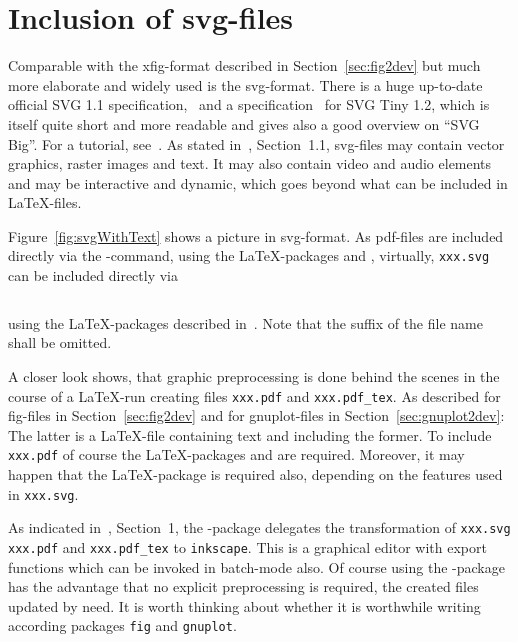 \section{Inclusion of svg-files}\label{sec:picSvg}

Comparable with the xfig-format described in Section~\ref{sec:fig2dev} 
but much more elaborate and widely used is the \gls{svg}-format. 
There is a huge up-to-date official SVG 1.1 specification,~\cite{Svg11} 
and a specification~\cite{Svg12Tiny} for SVG Tiny 1.2, 
which is itself quite short and more readable 
and gives also a good overview on ``SVG Big''. 
For a tutorial, see~\cite{SvgTut}. 
As stated in~\cite{Svg12Tiny}, Section~1.1, 
svg-files may contain vector graphics, raster images and text. 
It may also contain video and audio elements 
and may be interactive and dynamic, 
which goes beyond what can be included in \LaTeX-files. 

Figure~\ref{fig:svgWithText} shows a picture in \gls{svg}-format. 
As pdf-files are included directly 
via the -command, 
using the \LaTeX-packages  and , 
virtually, 
\texttt{xxx.svg} can be included directly via 
\begin{lstlisting}[language=TeX]
%%
\end{lstlisting}
%
using the \LaTeX-packages  described in~\cite{SvgP}. 
Note that the suffix of the file name shall be omitted. 

A closer look shows, that graphic preprocessing is done behind the scenes 
in the course of a \LaTeX-run 
creating files \texttt{xxx.pdf} and \texttt{xxx.pdf\_tex}. 
As described for fig-files in Section~\ref{sec:fig2dev} 
and for gnuplot-files in Section~\ref{sec:gnuplot2dev}: 
The latter is a \LaTeX-file containing text 
and including the former. 
To include \texttt{xxx.pdf} 
of course the \LaTeX-packages  and  
are required. 
Moreover, it may happen that the \LaTeX-package  
is required also, depending on the features used in \texttt{xxx.svg}. 

As indicated in~\cite{SvgP}, Section~1, 
the -package delegates the transformation 
of \texttt{xxx.svg} \texttt{xxx.pdf} and \texttt{xxx.pdf\_tex} 
to \texttt{inkscape}. 
This is a graphical editor with export functions 
which can be invoked in batch-mode also. 
Of course using the -package has the advantage 
that no explicit preprocessing is required, 
the created files updated by need. 
It is worth thinking about whether it is worthwhile 
writing according packages \texttt{fig} and \texttt{gnuplot}. 

